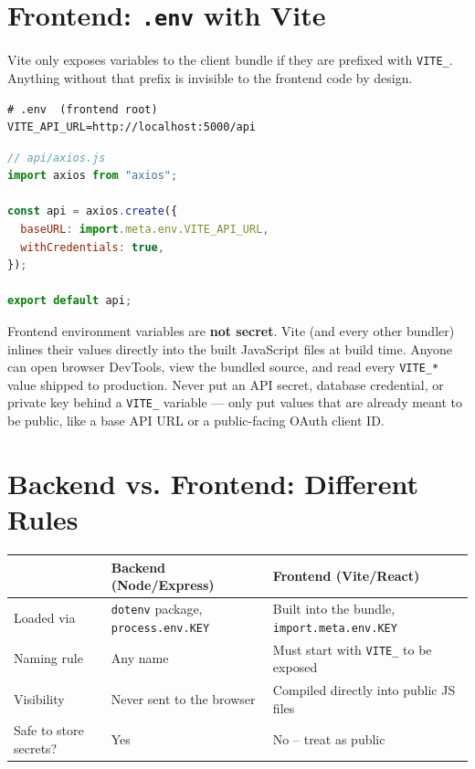 \section{Frontend: \texttt{.env} with Vite}

Vite only exposes variables to the client bundle if they are prefixed with
\texttt{VITE\_}. Anything without that prefix is invisible to the frontend
code by design.

\begin{lstlisting}
# .env  (frontend root)
VITE_API_URL=http://localhost:5000/api
\end{lstlisting}

\begin{lstlisting}[language=JavaScript]
// api/axios.js
import axios from "axios";

const api = axios.create({
  baseURL: import.meta.env.VITE_API_URL,
  withCredentials: true,
});

export default api;
\end{lstlisting}

\begin{warnbox}[WARNING]
Frontend environment variables are \textbf{not secret}. Vite (and every
other bundler) inlines their values directly into the built JavaScript
files at build time. Anyone can open browser DevTools, view the bundled
source, and read every \texttt{VITE\_*} value shipped to production. Never
put an API secret, database credential, or private key behind a
\texttt{VITE\_} variable --- only put values that are already meant to be
public, like a base API URL or a public-facing OAuth client ID.
\end{warnbox}

\section{Backend vs. Frontend: Different Rules}

\begin{center}
\begin{tabularx}{\textwidth}{lXX}
\toprule
\textbf{} & \textbf{Backend (Node/Express)} & \textbf{Frontend (Vite/React)} \\
\midrule
Loaded via & \texttt{dotenv} package, \texttt{process.env.KEY} & Built into the bundle, \texttt{import.meta.env.KEY} \\
Naming rule & Any name & Must start with \texttt{VITE\_} to be exposed \\
Visibility & Never sent to the browser & Compiled directly into public JS files \\
Safe to store secrets? & Yes & No -- treat as public \\
\bottomrule
\end{tabularx}
\end{center}

